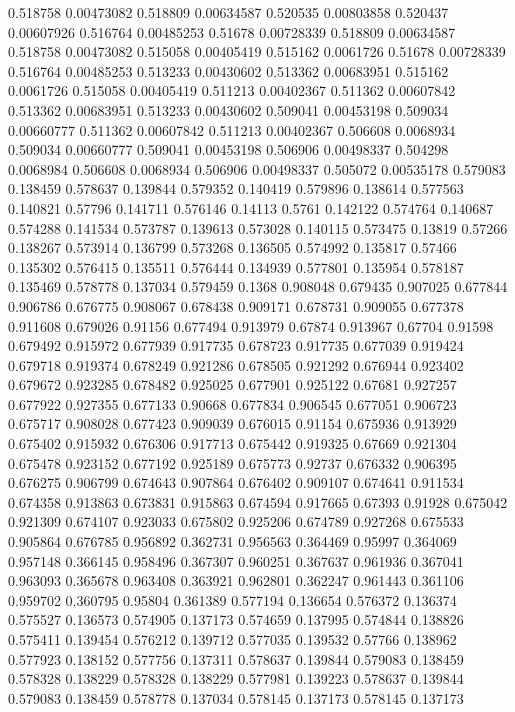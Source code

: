 0.518758 0.00473082
0.518809 0.00634587
0.520535 0.00803858
0.520437 0.00607926
0.516764 0.00485253
0.51678 0.00728339
0.518809 0.00634587
0.518758 0.00473082
0.515058 0.00405419
0.515162 0.0061726
0.51678 0.00728339
0.516764 0.00485253
0.513233 0.00430602
0.513362 0.00683951
0.515162 0.0061726
0.515058 0.00405419
0.511213 0.00402367
0.511362 0.00607842
0.513362 0.00683951
0.513233 0.00430602
0.509041 0.00453198
0.509034 0.00660777
0.511362 0.00607842
0.511213 0.00402367
0.506608 0.0068934
0.509034 0.00660777
0.509041 0.00453198
0.506906 0.00498337
0.504298 0.0068984
0.506608 0.0068934
0.506906 0.00498337
0.505072 0.00535178
0.579083 0.138459
0.578637 0.139844
0.579352 0.140419
0.579896 0.138614
0.577563 0.140821
0.57796 0.141711
0.576146 0.14113
0.5761 0.142122
0.574764 0.140687
0.574288 0.141534
0.573787 0.139613
0.573028 0.140115
0.573475 0.13819
0.57266 0.138267
0.573914 0.136799
0.573268 0.136505
0.574992 0.135817
0.57466 0.135302
0.576415 0.135511
0.576444 0.134939
0.577801 0.135954
0.578187 0.135469
0.578778 0.137034
0.579459 0.1368
0.908048 0.679435
0.907025 0.677844
0.906786 0.676775
0.908067 0.678438
0.909171 0.678731
0.909055 0.677378
0.911608 0.679026
0.91156 0.677494
0.913979 0.67874
0.913967 0.67704
0.91598 0.679492
0.915972 0.677939
0.917735 0.678723
0.917735 0.677039
0.919424 0.679718
0.919374 0.678249
0.921286 0.678505
0.921292 0.676944
0.923402 0.679672
0.923285 0.678482
0.925025 0.677901
0.925122 0.67681
0.927257 0.677922
0.927355 0.677133
0.90668 0.677834
0.906545 0.677051
0.906723 0.675717
0.908028 0.677423
0.909039 0.676015
0.91154 0.675936
0.913929 0.675402
0.915932 0.676306
0.917713 0.675442
0.919325 0.67669
0.921304 0.675478
0.923152 0.677192
0.925189 0.675773
0.92737 0.676332
0.906395 0.676275
0.906799 0.674643
0.907864 0.676402
0.909107 0.674641
0.911534 0.674358
0.913863 0.673831
0.915863 0.674594
0.917665 0.67393
0.91928 0.675042
0.921309 0.674107
0.923033 0.675802
0.925206 0.674789
0.927268 0.675533
0.905864 0.676785
0.956892 0.362731
0.956563 0.364469
0.95997 0.364069
0.957148 0.366145
0.958496 0.367307
0.960251 0.367637
0.961936 0.367041
0.963093 0.365678
0.963408 0.363921
0.962801 0.362247
0.961443 0.361106
0.959702 0.360795
0.95804 0.361389
0.577194 0.136654
0.576372 0.136374
0.575527 0.136573
0.574905 0.137173
0.574659 0.137995
0.574844 0.138826
0.575411 0.139454
0.576212 0.139712
0.577035 0.139532
0.57766 0.138962
0.577923 0.138152
0.577756 0.137311
0.578637 0.139844
0.579083 0.138459
0.578328 0.138229
0.578328 0.138229
0.577981 0.139223
0.578637 0.139844
0.579083 0.138459
0.578778 0.137034
0.578145 0.137173
0.578145 0.137173
